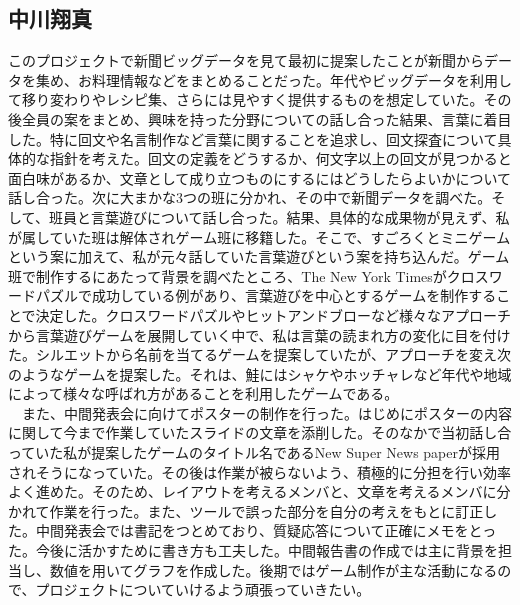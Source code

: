 \subsection{中川翔真}
このプロジェクトで新聞ビッグデータを見て最初に提案したことが新聞からデータを集め、お料理情報などをまとめることだった。年代やビッグデータを利用して移り変わりやレシピ集、さらには見やすく提供するものを想定していた。その後全員の案をまとめ、興味を持った分野についての話し合った結果、言葉に着目した。特に回文や名言制作など言葉に関することを追求し、回文探査について具体的な指針を考えた。回文の定義をどうするか、何文字以上の回文が見つかると面白味があるか、文章として成り立つものにするにはどうしたらよいかについて話し合った。次に大まかな3つの班に分かれ、その中で新聞データを調べた。そして、班員と言葉遊びについて話し合った。結果、具体的な成果物が見えず、私が属していた班は解体されゲーム班に移籍した。そこで、すごろくとミニゲームという案に加えて、私が元々話していた言葉遊びという案を持ち込んだ。ゲーム班で制作するにあたって背景を調べたところ、The New York Timesがクロスワードパズルで成功している例があり、言葉遊びを中心とするゲームを制作することで決定した。クロスワードパズルやヒットアンドブローなど様々なアプローチから言葉遊びゲームを展開していく中で、私は言葉の読まれ方の変化に目を付けた。シルエットから名前を当てるゲームを提案していたが、アプローチを変え次のようなゲームを提案した。それは、鮭にはシャケやホッチャレなど年代や地域によって様々な呼ばれ方があることを利用したゲームである。\\
　また、中間発表会に向けてポスターの制作を行った。はじめにポスターの内容に関して今まで作業していたスライドの文章を添削した。そのなかで当初話し合っていた私が提案したゲームのタイトル名であるNew Super News paperが採用されそうになっていた。その後は作業が被らないよう、積極的に分担を行い効率よく進めた。そのため、レイアウトを考えるメンバと、文章を考えるメンバに分かれて作業を行った。また、ツールで誤った部分を自分の考えをもとに訂正した。中間発表会では書記をつとめており、質疑応答について正確にメモをとった。今後に活かすために書き方も工夫した。中間報告書の作成では主に背景を担当し、数値を用いてグラフを作成した。後期ではゲーム制作が主な活動になるので、プロジェクトについていけるよう頑張っていきたい。

